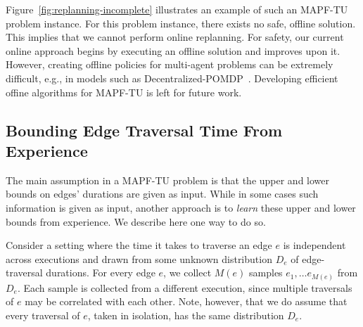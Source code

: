 \documentclass[jair,twoside,11pt,theapa]{article}
\newcommand{\mapftu}{MAPF-TU\xspace}
\begin{document}
Figure~\ref{fig:replanning-incomplete} illustrates an example of such an MAPF-TU problem instance. For this problem instance, there exists no safe, offline solution. This implies that we cannot perform online replanning. For safety, our current online approach begins by executing an offline solution and improves upon it.
%
However, creating offline policies for multi-agent problems can be extremely difficult, e.g., in models such as Decentralized-POMDP~. Developing efficient offine algorithms for MAPF-TU is left for future work. 




\subsection{Bounding Edge Traversal Time From Experience}
\label{sec:sample-complexity}
The main assumption in a \mapftu problem is that the upper and lower bounds on edges' durations are given as input. While in some cases such information is given as input, 
another approach is to \emph{learn} these upper and lower bounds from experience. 
 We describe here one way to do so. 


Consider a setting where the time it takes to traverse an edge $e$ is independent across executions and drawn from some unknown distribution $D_e$ of edge-traversal durations.  
For every edge $e$, we collect $M(e)$ samples $e_1,\ldots e_{M(e)}$ from $D_e$. 
Each sample is collected from a different execution, since multiple traversals of $e$ may be correlated with each other. Note, however, that we do assume that every traversal of $e$, taken in isolation, has the same distribution $D_e$. 
\end{document}
